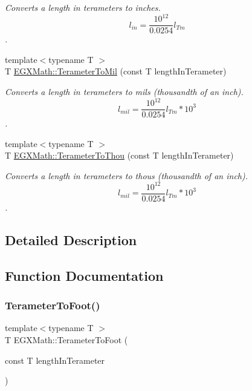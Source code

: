 \begin{DoxyCompactItemize}
\begin{DoxyCompactList}\small\item\em Converts a length in terameters to inches. \[ l_{in}= \frac{10^{12}}{0.0254} l_{Tm} \]. \end{DoxyCompactList}\item 
{\footnotesize template$<$typename T $>$ }\\T \mbox{\hyperlink{group___e_g_x_math-_conversions-_length_conversions-_terameter-_imperial_ga9ae6fa58a9800d91e89f76e68838fa86}{E\+G\+X\+Math\+::\+Terameter\+To\+Mil}} (const T length\+In\+Terameter)
\begin{DoxyCompactList}\small\item\em Converts a length in terameters to mils (thousandth of an inch). \[ l_{mil}= \frac{10^{12}}{0.0254} l_{Tm} * 10^{3} \]. \end{DoxyCompactList}\item 
{\footnotesize template$<$typename T $>$ }\\T \mbox{\hyperlink{group___e_g_x_math-_conversions-_length_conversions-_terameter-_imperial_ga3e00f52eb5c96d53031f36d7003a0e5e}{E\+G\+X\+Math\+::\+Terameter\+To\+Thou}} (const T length\+In\+Terameter)
\begin{DoxyCompactList}\small\item\em Converts a length in terameters to thous (thousandth of an inch). \[ l_{mil}= \frac{10^{12}}{0.0254} l_{Tm} * 10^{3} \]. \end{DoxyCompactList}\end{DoxyCompactItemize}


\subsection{Detailed Description}


\subsection{Function Documentation}
\mbox{\label{group___e_g_x_math-_conversions-_length_conversions-_terameter-_imperial_gaf903b744223a3acb964367da6f14b96f}} 
\subsubsection{\texorpdfstring{Terameter\+To\+Foot()}{TerameterToFoot()}}
{\footnotesize\ttfamily template$<$typename T $>$ \\
T E\+G\+X\+Math\+::\+Terameter\+To\+Foot (\begin{DoxyParamCaption}\item[{const T}]{length\+In\+Terameter }\end{DoxyParamCaption})}



